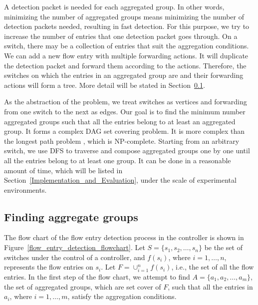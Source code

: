 A detection packet is needed for each aggregated group. In other words, minimizing the number of aggregated groups means minimizing the number of detection packets needed, resulting in fast detection. For this purpose, we try to increase the number of entries that one detection packet goes through. On a switch, there may be a collection of entries that suit the aggregation conditions. We can add a new flow entry with multiple forwarding actions. It will duplicate the detection packet and forward them according to the actions. Therefore, the switches on which the entries in an aggregated group are and their forwarding actions will form a tree. More detail will be stated in Section~\ref{Aggregated_group_finding}.

As the abstraction of the problem, we treat switches as vertices and forwarding from one switch to the next as edges. Our goal is to find the minimum number aggregated groups such that all the entries belong to at least an aggregated group. It forms a complex DAG set covering problem. It is more complex than the longest path problem \cite{DMR97,RU04}, which is NP-complete. Starting from an arbitrary switch, we use DFS to traverse and compose aggregated groups one by one until all the entries belong to at least one group. It can be done in a reasonable amount of time, which will be listed in Section~\ref{Implementation_and_Evaluation}, under the scale of experimental environments.

\subsection{Finding aggregate groups}
\label{Aggregated_group_finding}

The flow chart of the flow entry detection process in the controller is shown in Figure~\ref{flow_entry_detection_flowchart}. Let $S=\{s_1,s_2,\ldots,s_n\}$ be the set of switches under the control of a controller, and $f(s_i)$, where $i=1,\ldots,n$, represents the flow entries on $s_i$. Let $F=\cup_{i=1}^n f(s_i)$, i.e., the set of all the flow entries. In the first step of the flow chart, we attempt to find $A=\{a_1, a_2, \ldots, a_m\}$, the set of aggregated groups, which are set cover of $F$, such that all the entries in $a_i$, where $i=1,\ldots,m$, satisfy the aggregation conditions.

